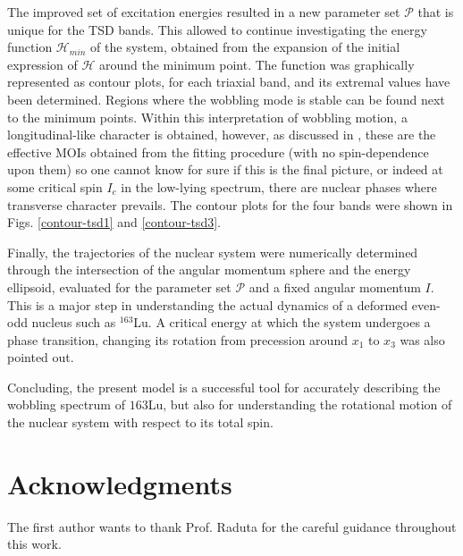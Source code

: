 \documentclass[%
 reprint,
 amsmath,
 amssymb,
 aps,
 floatfix,
]{revtex4-2}
\begin{document}
The improved set of excitation energies resulted in a new parameter set $\mathcal{P}$ that is unique for the TSD bands. This allowed to continue investigating the energy function $\mathcal{H}_{min}$ of the system, obtained from the expansion of the initial expression of $\mathcal{H}$ around the minimum point. The function was graphically represented as contour plots, for each triaxial band, and its extremal values have been determined. Regions where the wobbling mode is stable can be found next to the minimum points. Within this interpretation of wobbling motion, a longitudinal-like character is obtained, however, as discussed in \cite{raduta2020new}, these are the effective MOIs obtained from the fitting procedure (with no spin-dependence upon them) so one cannot know for sure if this is the final picture, or indeed at some critical spin $I_c$ in the low-lying spectrum, there are nuclear phases where transverse character prevails. The contour plots for the four bands were shown in Figs. \ref{contour-tsd1} and \ref{contour-tsd3}.

Finally, the trajectories of the nuclear system were numerically determined through the intersection of the angular momentum sphere and the energy ellipsoid, evaluated for the parameter set $\mathcal{P}$ and a fixed angular momentum $I$. This is a major step in understanding the actual dynamics of a deformed even-odd nucleus such as $^{163}$Lu. A critical energy at which the system undergoes a phase transition, changing its rotation from precession around $x_1$ to $x_3$ was also pointed out.

Concluding, the present model is a successful tool for accurately describing the wobbling spectrum of ${163}$Lu, but also for understanding the rotational motion of the nuclear system with respect to its total spin.


\section{Acknowledgments}

The first author wants to thank Prof. Raduta for the careful guidance throughout this work.

\end{document}
